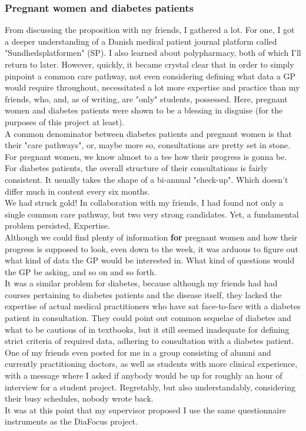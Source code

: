 \subsubsection*{Pregnant women and diabetes patients}
From discussing the proposition with my friends, I gathered a lot. For one, I got a deeper understanding of a Danish medical patient journal platform called "Sundhedsplatformen" (SP). I also learned about polypharmacy, both of which I'll return to later. However, quickly, it became crystal clear that in order to simply pinpoint a common care pathway, not even considering defining what data a GP would require throughout, necessitated a lot more expertise and practice than my friends, who, and, as of writing, are "only" students, possessed. Here, pregnant women and diabetes patients were shown to be a blessing in disguise (for the purposes of this project at least).
\\
A common denominator between diabetes patients and pregnant women is that their "care pathways", or, maybe more so, consultations are pretty set in stone. For pregnant women, we know almost to a tee how their progress is gonna be. For diabetes patients, the overall structure of their consultations is fairly consistent. It usually takes the shape of a bi-annual "check-up". Which doesn't differ much in content every six months.
\\
We had struck gold! In collaboration with my friends, I had found not only a single common care pathway, but two very strong candidates. Yet, a fundamental problem persisted, Expertise.
\\
Although we could find plenty of information \textbf{for} pregnant women and how their progress is supposed to look, even down to the week, it was arduous to figure out what kind of data the GP would be interested in. What kind of questions would the GP be asking, and so on and so forth. 
\\
It was a similar problem for diabetes, because although my friends had had courses pertaining to diabetes patients and the disease itself, they lacked the expertise of actual medical practitioners who have sat face-to-face with a diabetes patient in consultation. They could point out common sequelae of diabetes and what to be cautious of in textbooks, but it still seemed inadequate for defining strict criteria of required data, adhering to consultation with a diabetes patient. 
\\
One of my friends even posted for me in a group consisting of alumni and currently practitioning doctors, as well as students with more clinical experience, with a message where I asked if anybody would be up for roughly an hour of interview for a student project. Regretably, but also understandably, considering their busy schedules, nobody wrote back.
\\
It was at this point that my supervisor proposed I use the same questionnaire instruments as the DiaFocus project.



